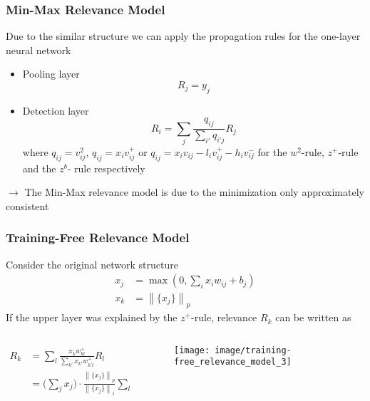 \documentclass{beamer}
\newcommand\norm[1]{\left\lVert#1\right\rVert}
\begin{document}
\begin{frame}
\frametitle{Min-Max Relevance Model}
Due to the similar structure we can apply the propagation rules for the one-layer neural network
\begin{itemize}
\item Pooling layer
\begin{equation*}
R_j = y_j
\end{equation*}

\item Detection layer
\begin{equation*}
R_i = \sum_j \frac{q_{ij}}{\sum_{i'} q_{i'j}} R_j
\end{equation*}
where $q_{ij}= v_{ij}^2$, $q_{ij}= x_i v_{ij}^+$ or $q_{ij}= x_i v_{ij} - l_i v_{ij}^+ - h_i v_{ij}^-$ for the $w^2$-rule, $z^+$-rule and the $z^b$- rule respectively
\end{itemize}
\vspace{0.5cm}

$\rightarrow$ The Min-Max relevance model is due to the minimization only approximately consistent
\end{frame}



\begin{frame}
\frametitle{Training-Free Relevance Model}
Consider the original network structure
\begin{align*}
x_j &= \max(0,\sum_ix_i w_{ij} + b_j)\\
x_k &= \norm{\{x_j\}}_p
\end{align*}
If the upper layer was explained by the $z^+$-rule, relevance $R_k$ can be written as


 \begin{columns}
          \begin{column}{5cm}
			\begin{align*}
			R_k &= \sum_l \frac{x_k w_{kl}^+}{\sum_{k'} x_{k'} w_{k'l}^+} R_l\\
				&= \bigl( \sum_j x_j \bigr)\cdot \frac{\norm{\{x_j\}}_p}{\norm{\{x_j\}}_1}   \sum_l \frac{w_{kl}^+R_l}{\sum_{k'} x_{k'} w_{k'l}^+} 
			\end{align*}
            \end{column} 
            \begin{column}{5cm}
			\begin{figure}
			\label{fig1}
			\texttt{[image: image/training-free\_relevance\_model\_3]}
			\end{figure}
	\end{column}
\end{columns} 

\end{frame}
\end{document}
